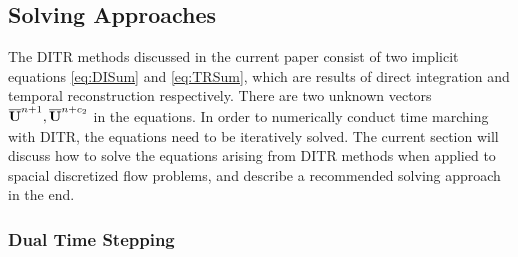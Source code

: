 \documentclass[preprint,12pt]{elsarticle}
\begin{document}


\subsection{Solving Approaches}
\renewcommand{\Res}{\mathcal{R}}
\newcommand{\Jres}{\mathcal{J}}
\newcommand{\eye}{\mathbf{I}}
\newcommand{\J}{\mathbf{J}}
\newcommand{\FF}{\mathcal{F}}

The DITR methods discussed in the current paper
consist of two implicit equations \eqref{eq:DISum} and
\eqref{eq:TRSum}, which are results of direct integration
and temporal reconstruction respectively.
There are two unknown vectors $\overline{\mathbf{U}}^{n+1},\overline{\mathbf{U}}^{n+c_2}$ in the equations.
In order to numerically conduct time marching with DITR, the equations
need to be iteratively solved.
The current section will discuss
how to solve the equations arising from DITR methods
when applied to spacial discretized flow problems, and
describe a recommended solving approach in the end.

\subsubsection{Dual Time Stepping}
\label{sssec:dualTime}
\end{document}
